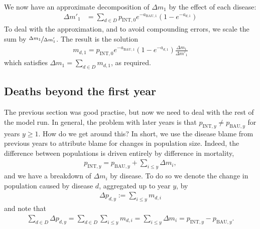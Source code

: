 \documentclass[]{article}
\begin{document}
We now have an approximate decomposition of $\Delta m_1$ by the effect of each disease:
\begin{align*}
	\Delta m'_1 &= \sum_{d \in D} p_{\text{INT}, 0} e^{-a_{\text{BAU}, 1}} \left(1 - e^{-a_{d, 1}}\right)
\end{align*}
To deal with the approximation, and to avoid compounding errors, we scale the sum by $\sfrac{\Delta m_1}{\Delta m'_1}$. The result is the solution
\begin{align*}
	m_{d, 1} = p_{\text{INT}, 0} e^{-a_{\text{BAU}, 1}} \left(1 - e^{-a_{d, 1}}\right) \frac{\Delta m_1}{\Delta m'_1} 
\end{align*}
which satisfies $\Delta m_1 = \sum_{d \in D} m_{d, 1}$, as required.

\subsection{Deaths beyond the first year}

The previous section was good practise, but now we need to deal with the rest of the model run. In general, the problem with later years is that $p_{\text{INT}, y} \neq p_{\text{BAU}, y}$ for years $y \geq 1$. How do we get around this? In short, we use the disease blame from previous years to attribute blame for changes in population size. Indeed, the difference between populations is driven entirely by difference in mortality,
\begin{align*}
	p_{\text{INT}, y} = p_{\text{BAU}, y} + \sum_{i \leq y} \Delta m_i,
\end{align*}
and we have a breakdown of $\Delta m_i$ by disease. To do so we denote the change in population caused by disease $d$, aggregated up to year $y$, by
\begin{align*}
	\Delta p_{d, y} := \sum_{i \leq y} m_{d,i}
\end{align*}
and note that 
\begin{align*}
		\sum_{d \in D} \Delta p_{d, y} = \sum_{d \in D}\sum_{i \leq y} m_{d,i} = \sum_{i \leq y} \Delta m_i = p_{\text{INT}, y} - p_{\text{BAU}, y}.
\end{align*}
\end{document}
